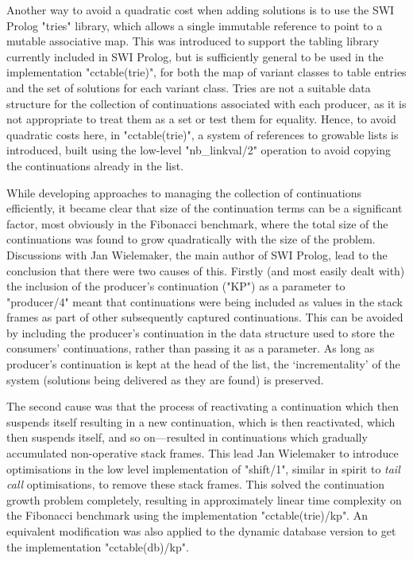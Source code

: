 Another way to avoid a quadratic cost when adding solutions is to use the SWI Prolog
"tries" library, which allows a single immutable reference to point to a mutable
associative map. This was introduced to support the tabling library currently included
in SWI Prolog, but is sufficiently general to be used in the implementation "cctable(trie)", 
for both the map of variant classes to table entries and the set of solutions for each
variant class.
%
Tries are not a suitable data structure for the collection of continuations associated
with each producer, as it is not appropriate to treat them as a set or test them for equality.
Hence, to avoid quadratic costs here, in "cctable(trie)", a system of references to 
growable lists is introduced, built using
the low-level "nb_linkval/2" operation to avoid copying the continuations already in the
list.

While developing approaches to managing the collection of continuations efficiently,
it became clear that size of the continuation terms can be a significant factor, %
most obviously in the Fibonacci benchmark, where the total size
of the continuations was found to grow quadratically with the size of the problem.
Discussions with Jan Wielemaker, the main author of SWI Prolog, lead to the conclusion
that there were two causes of this. Firstly (and most easily dealt with) the inclusion
of the producer's continuation ("KP") as a parameter to "producer/4" meant that continuations
were being included as values in the stack frames as part of other subsequently captured continuations.
This can be avoided by including the producer's continuation in the data structure used
to store the consumers' continuations, rather than passing it as a parameter. As long
as producer's continuation is kept at the head of the list, the 
`incrementality' of the system (solutions being delivered as they are found)
is preserved.

The second cause was that the process of reactivating a continuation which then suspends itself
resulting in a new continuation, which is then reactivated, which then suspends itself,
and so on---resulted in continuations which gradually accumulated non-operative stack frames.
This lead Jan Wielemaker to introduce optimisations in the low level implementation of 
"shift/1", similar in spirit to \emph{tail call}
optimisations, to remove these stack frames.
This solved the continuation growth problem 
completely, resulting in approximately linear time complexity on the Fibonacci benchmark using
the implementation "cctable(trie)/kp".
An equivalent modification was also applied to the dynamic database version 
to get the implementation "cctable(db)/kp".

